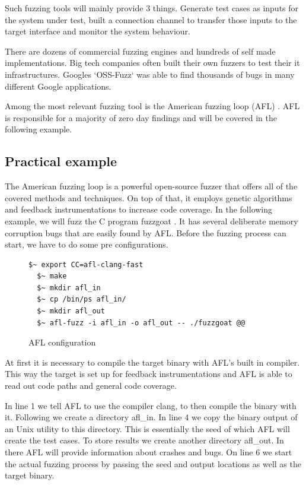 \documentclass[journal=tosc,final]{iacrtrans}
\begin{document}
Such fuzzing tools will mainly provide 3 things. Generate test cases as inputs for the system under test, built a connection channel to transfer those inputs to the target interface and monitor the system behaviour.

There are dozens of commercial fuzzing engines and hundreds of self made implementations. Big tech companies often built their own fuzzers to test their it infrastructures. Googles `OSS-Fuzz` was able to find thousands of bugs in many different Google applications. 

Among the most relevant fuzzing tool is the American fuzzing loop (AFL) \cite{afl}.
AFL is responsible for a majority of zero day findings and will be covered in the following example.
\subsection{Practical example}
The American fuzzing loop is a powerful open-source fuzzer that offers all of the covered methods and techniques. On top of that, it employs genetic algorithms and feedback instrumentations to increase code coverage. In the following example, we will fuzz the C program fuzzgoat \cite{goat}. It has several deliberate memory corruption bugs that are easily found by AFL. Before the fuzzing process can start, we have to do some pre configurations. 
\begin{figure}[h]
 \caption{AFL configuration}
 \begin{lstlisting}[style=code]
  $~ export CC=afl-clang-fast
  $~ make
  $~ mkdir afl_in
  $~ cp /bin/ps afl_in/   
  $~ mkdir afl_out
  $~ afl-fuzz -i afl_in -o afl_out -- ./fuzzgoat @@
\end{lstlisting}
\end{figure}

At first it is necessary to compile the target binary with AFL's built in compiler. This way the target is set up for feedback instrumentations and AFL is able to read out code paths and general code coverage.

In line 1 we tell AFL to use the compiler clang, to then compile the binary with it.
Following we create a directory afl\_in. In line 4 we copy the binary output of an Unix utility to this directory. This is essentially the seed of which AFL will create the test cases. To store results we create another directory afl\_out. In there AFL will provide information about crashes and bugs. 
On line 6 we start the actual fuzzing process by passing the seed and output locations as well as the target binary. 
\end{document}

